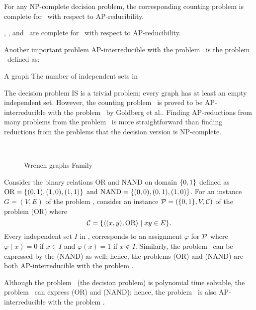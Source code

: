 \begin{theorem}  \label{thrm:npcp}
For any NP-complete decision problem, the corresponding counting problem is complete
for \cp\ with respect to AP-reducibility.
\end{theorem}

\begin{cor}
\csat, \ctsat, and \ctcol\ are complete for \cp\ with respect to AP-reducibility.
\end{cor}

Another important problem AP-interreducible with the problem \csat\ is
the problem \cisp\ defined as:

\pnndef%
{A graph \mG}
{The number of independent sets in \mG}

The decision problem IS is a trivial problem; every graph has at least an
empty independent set.
However, the counting problem \cisp\ is proved to be AP-interreducible with the problem \csat\ 
by Goldberg et al.\cite{Leslie03}\@.
Finding AP-reductions from many problems from the problem \cisp\ is more straightforward than
finding reductions from the problems that the decision version is NP-complete.

\begin{figure}[h]
\centering 
\subfigure[\ensuremath{Wr_0}]{\label{fig:Wr0}}\hspace{4.78cm}
\subfigure[\ensuremath{Wr_1}]{\label{fig:Wr1}}\\
\subfigure[\ensuremath{Wr_2}]{\label{fig:Wr2}}\hspace{4cm}
\subfigure[\ensuremath{Wr_3}]{\label{fig:Wr3}}
\caption{Wrench graphs Family}
\label{fig:wrench}
\end{figure}

\begin{example}
Consider the binary relations OR and NAND  on domain \(\{{{0,1}}\}\) defined as
\(\mathrm{OR}=\{{(0,1),(1,0),(1,1)}\}\) and \(\mathrm{NAND}=\{{(0,0),(0,1),(1,0)}\}\)\@.
For an instance \(G = (V,E)\) of the problem \cisp, consider
an instance \(\mathcal{P}=(\{{{0,1}}\},V,\mathcal{C})\)
of the problem \ccsp(OR) where \[\mathcal{C} = \{\langle (x,y), \mathrm{OR} \rangle \mid xy \in E\}.\]
Every independent set \(I\) in \mG, corresponds to an assignment \(\varphi\)
for \(\mathcal{P}\) where \(\varphi(x) = 0\) if \(x\in I\) and \(\varphi(x)=1\) if \(x\notin I\)\@.
Similarly, the problem \cisp\ can be expressed by the \ccsp(NAND) as well;
hence, the problems \ccsp(OR) and \ccsp(NAND) are both AP-interreducible with the
problem \csat\@.

Although the problem \dsat\ (the decision problem) is polynomial time
solvable, the problem \cdsat\ can express \ccsp(OR) and
\ccsp(NAND); hence, the problem \cdsat\ is also AP-interreducible with the problem \csat\@.
\end{example}

